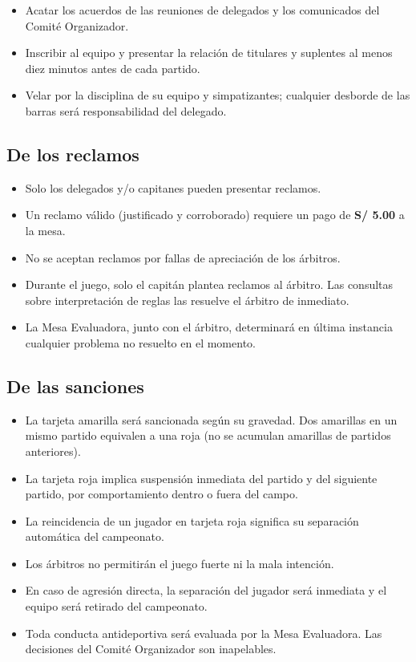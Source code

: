 	\begin{itemize}
		\item Acatar los acuerdos de las reuniones de delegados y los comunicados del Comité Organizador.
		\item Inscribir al equipo y presentar la relación de titulares y suplentes al menos diez minutos antes de cada partido.
		\item Velar por la disciplina de su equipo y simpatizantes; cualquier desborde de las barras será responsabilidad del delegado.
	\end{itemize}

	\subsection{De los reclamos}

	\begin{itemize}
		\item Solo los delegados y/o capitanes pueden presentar reclamos.
		\item Un reclamo válido (justificado y corroborado) requiere un pago de \textbf{S/ 5.00} a la mesa.
		\item No se aceptan reclamos por fallas de apreciación de los árbitros.
		\item Durante el juego, solo el capitán plantea reclamos al árbitro. Las consultas sobre interpretación de reglas las resuelve el árbitro de inmediato.
		\item La Mesa Evaluadora, junto con el árbitro, determinará en última instancia cualquier problema no resuelto en el momento.
	\end{itemize}

	\subsection{De las sanciones}

	\begin{itemize}
		\item La tarjeta amarilla será sancionada según su gravedad. Dos amarillas en un mismo partido equivalen a una roja (no se acumulan amarillas de partidos anteriores).
		\item La tarjeta roja implica suspensión inmediata del partido y del siguiente partido, por comportamiento dentro o fuera del campo.
		\item La reincidencia de un jugador en tarjeta roja significa su separación automática del campeonato.
		\item Los árbitros no permitirán el juego fuerte ni la mala intención.
		\item En caso de agresión directa, la separación del jugador será inmediata y el equipo será retirado del campeonato.
		\item Toda conducta antideportiva será evaluada por la Mesa Evaluadora. Las decisiones del Comité Organizador son inapelables.
	\end{itemize}

